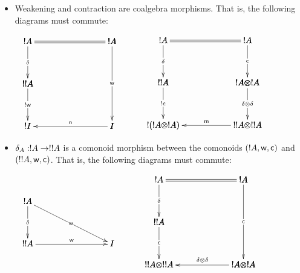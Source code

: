 \begin{definition}
\begin{itemize}
\begin{itemize}
    \item Weakening and contraction are coalgebra morphisms.  That is,
      the following diagrams must commute:
      \begin{center}
        \begin{math}
          \begin{array}{lll}
            \bfig
            \square|amma|/=`->``/<1000,500>[
              !A`
              !A`
              !!A`;`
              \delta``]

            \square(0,-500)|amma|/`->``<-/<1000,500>[
              !!A``
              !I`
              I;`
              !\weak``
              \nm]

            \morphism(1000,500)|m|<0,-1000>[
              !A`
              I;
              \weak]
            \efig
            & \quad &
            \bfig
            \square|amma|/=`->`->`/<1000,500>[
              ! A`
              ! A`
              ! ! A`
              !A \otimes !A;`
              \delta`
              \con`]

            \square(0,-500)|amma|/`->`->`<-/<1000,500>[
              ! ! A`
              !A \otimes ! A`
              !(!A \otimes !A)`
              !!A \otimes !!A;`
              ! \con`
              \delta \otimes \delta`
              \mm]
            \efig
          \end{array}
        \end{math}
      \end{center}
      
    \item $\delta_A : !A \rightarrow !!A$ is a comonoid morphism between the
      comonoids $(!A,\mathsf{w},\mathsf{c})$ and $(!!A,\mathsf{w},\mathsf{c})$.  That is,
      the following diagrams must commute:
      \begin{center}
        \begin{math}
          \begin{array}{lll}            
            \bfig
            \btriangle|mma|/->`->`->/<1000,500>[
              !A`
              !!A`
              I;
              \delta`
              \weak`
              \weak]            
            \efig
            & \quad &
            \bfig
      \square|amma|/=`->``/<1000,500>[
        !A`
        !A`
        !!A`;`
        \delta``]
      
      \square(0,-500)|amma|/`->``<-/<1000,500>[
        !!A``
        !!A \otimes !!A`
        !A \otimes !A;`
        \con``
        \delta \otimes \delta]
      
      \morphism(1000,500)|m|<0,-1000>[
        !A`
        !A \otimes !A;
        \con]
      \efig
          \end{array}
        \end{math}
      \end{center}                
  \end{itemize}
  \end{itemize}    
\end{definition}
